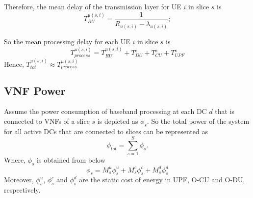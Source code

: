 \documentclass[conference]{IEEEtran}
\begin{document}
Therefore, the mean delay of the transmission layer for UE $i$ in slice $s$ is
\begin{equation}
 T_{RU}^{u(s,i)} = \frac{1}{R_{u(s,i)} - \lambda_{u(s,i)}};
\end{equation}

So the mean processing delay for each UE $i$ in slice $s$ is 
\begin{equation}
T_{process}^{u(s,i)} =  T_{RU}^{u(s,i)} + T_{DU}^{s} + T_{CU}^{s} + T_{UPF}^{s}
\end{equation}
Hence, $T_{tot}^{u(s,i)} \approx T_{process}^{u(s,i)} $
\subsection{VNF Power}
Assume the power consumption of baseband processing at each DC $d$ that is connected to VNFs of a slice $s$ is depicted as
$\phi_{s}$. So the total power of the system for all active DCs that are connected to slices can be represented as
\begin{equation*}
\textstyle \phi_{tot} = \sum_{s=1}^{S}\phi_{s}.
\end{equation*}
Where, $\phi_{s}$ is obtained from below
\begin{equation}
\phi_{s} = M_s^u \phi_s^u + M_s^c \phi_s^c+ M_s^d \phi_s^d
\end{equation}
Moreover, $\phi_s^u$, $\phi_s^c$ and $\phi_s^d$ are the static cost of energy in UPF, O-CU and O-DU, respectively. 
\end{document}
